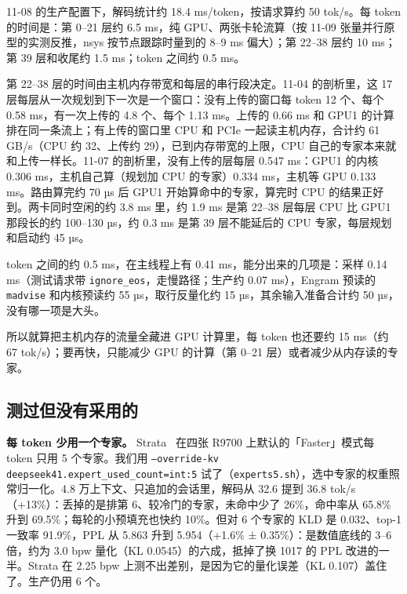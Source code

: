 \documentclass[11pt,a4paper]{article}
\newcommand{\code}[1]{\texttt{#1}}
\newcommand{\tps}{tok/s}
\begin{document}
11-08 的生产配置下，解码统计约 18.4 ms/token，按请求算约 50 \tps{}。每 token 的时间是：第 0--21 层约 6.5 ms，纯 GPU、两张卡轮流算（按 11-09 张量并行原型的实测反推，nsys 按节点跟踪时量到的 8--9 ms 偏大）；第 22--38 层约 10 ms；第 39 层和收尾约 1.5 ms；token 之间约 0.5 ms。

第 22--38 层的时间由主机内存带宽和每层的串行段决定。11-04 的剖析里，这 17 层每层从一次规划到下一次是一个窗口：没有上传的窗口每 token 12 个、每个 0.58 ms，有一次上传的 4.8 个、每个 1.13 ms。上传的 0.66 ms 和 GPU1 的计算排在同一条流上；有上传的窗口里 CPU 和 PCIe 一起读主机内存，合计约 61 GB/s（CPU 约 32、上传约 29），已到内存带宽的上限，CPU 自己的专家本来就和上传一样长。11-07 的剖析里，没有上传的层每层 0.547 ms：GPU1 的内核 0.306 ms，主机自己算（规划加 CPU 的专家）0.334 ms，主机等 GPU 0.133 ms。路由算完约 70 µs 后 GPU1 开始算命中的专家，算完时 CPU 的结果正好到。两卡同时空闲的约 3.8 ms 里，约 1.9 ms 是第 22--38 层每层 CPU 比 GPU1 那段长的约 100--130 µs，约 0.3 ms 是第 39 层不能延后的 CPU 专家，每层规划和启动约 45 µs。

token 之间的约 0.5 ms，在主线程上有 0.41 ms，能分出来的几项是：采样 0.14 ms（测试请求带 \code{ignore\_eos}，走慢路径；生产约 0.07 ms），Engram 预读的 \code{madvise} 和内核预读约 55 µs，取行反量化约 15 µs，其余输入准备合计约 50 µs，没有哪一项是大头。

所以就算把主机内存的流量全藏进 GPU 计算里，每 token 也还要约 15 ms（约 67 \tps{}）；要再快，只能减少 GPU 的计算（第 0--21 层）或者减少从内存读的专家。

\subsection{测过但没有采用的}
\label{sec:notadopted}

\textbf{每 token 少用一个专家。} Strata~\cite{strata} 在四张 R9700 上默认的「Faster」模式每 token 只用 5 个专家。我们用 \code{--override-kv deepseek41.expert\_used\_count=int:5} 试了（\code{experts5.sh}），选中专家的权重照常归一化。4.8 万上下文、只追加的会话里，解码从 32.6 提到 36.8 \tps{}（+13\%）：丢掉的是排第 6、较冷门的专家，未命中少了 26\%，命中率从 65.8\% 升到 69.5\%；每轮的小预填充也快约 10\%。但对 6 个专家的 KLD 是 0.032、top-1 一致率 91.9\%，PPL 从 5.863 升到 5.954（+1.6\% ± 0.35\%）：是数值底线的 3--6 倍，约为 3.0 bpw 量化（KL 0.0545）的六成，抵掉了换 1017 的 PPL 改进的一半。Strata 在 2.25 bpw 上测不出差别，是因为它的量化误差（KL 0.107）盖住了。生产仍用 6 个。
\end{document}
